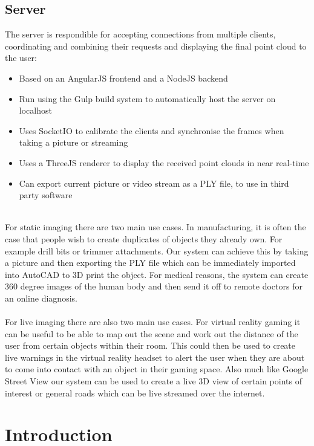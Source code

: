 \documentclass{article}
\begin{document}
\subsection{Server}
The server is respondible for accepting connections from multiple clients, coordinating and combining their requests and displaying the final point cloud to the user:
\begin{itemize}
\item Based on an AngularJS frontend and a NodeJS backend
\item Run using the Gulp build system to automatically host the server on localhost
\item Uses SocketIO to calibrate the clients and synchronise the frames when taking a picture or streaming
\item Uses a ThreeJS renderer to display the received point clouds in near real-time
\item Can export current picture or video stream as a PLY file, to use in third party software
\end{itemize}
~\\
For static imaging there are two main use cases. In manufacturing, it is often the case that people wish to create duplicates of objects they already own. For example drill bits or trimmer attachments. Our system can achieve this by taking a picture and then exporting the PLY file which can be immediately imported into AutoCAD to 3D print the object. For medical reasons, the system can create 360 degree images of the human body and then send it off to remote doctors for an online diagnosis.
\\\\
For live imaging there are also two main use cases. For virtual reality gaming it can be useful to be able to map out the scene and work out the distance of the user from certain objects within their room. This could then be used to create live warnings in the virtual reality headset to alert the user when they are about to come into contact with an object in their gaming space. Also much like Google Street View our system can be used to create a live 3D view of certain points of interest or general roads which can be live streamed over the internet.
\newpage

\section{Introduction}
\end{document}
